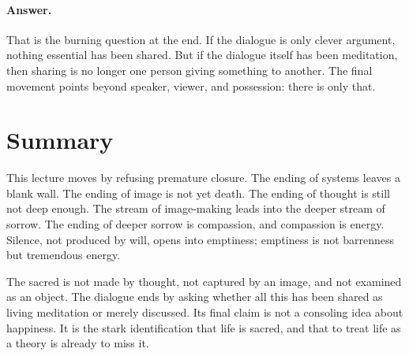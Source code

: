 \paragraph{Answer.}
That is the burning question at the end. If the dialogue is only clever argument, nothing essential has been shared. But if the dialogue itself has been meditation, then sharing is no longer one person giving something to another. The final movement points beyond speaker, viewer, and possession: there is only that.

\section{Summary}

This lecture moves by refusing premature closure. The ending of systems leaves a blank wall. The ending of image is not yet death. The ending of thought is still not deep enough. The stream of image-making leads into the deeper stream of sorrow. The ending of deeper sorrow is compassion, and compassion is energy. Silence, not produced by will, opens into emptiness; emptiness is not barrenness but tremendous energy.

The sacred is not made by thought, not captured by an image, and not examined as an object. The dialogue ends by asking whether all this has been shared as living meditation or merely discussed. Its final claim is not a consoling idea about happiness. It is the stark identification that life is sacred, and that to treat life as a theory is already to miss it.